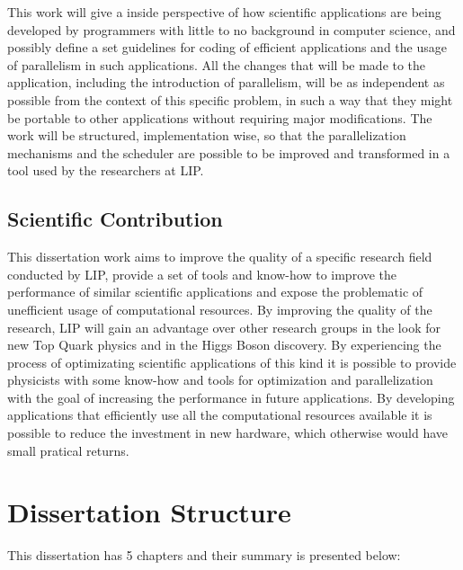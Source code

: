 This work will give a inside perspective of how scientific applications are being developed by programmers with little to no background in computer science, and possibly define a set guidelines for coding of efficient applications and the usage of parallelism in such applications. All the changes that will be made to the \tth application, including the introduction of parallelism, will be as independent as possible from the context of this specific problem, in such a way that they might be portable to other applications without requiring major modifications. The work will be structured, implementation wise, so that the parallelization mechanisms and the scheduler are possible to be improved and transformed in a tool used by the researchers at LIP.

\subsection{Scientific Contribution}
\label{ScientificContribution}

This dissertation work aims to improve the quality of a specific research field conducted by LIP, provide a set of tools and know-how to improve the performance of similar scientific applications and expose the problematic of unefficient usage of computational resources. By improving the quality of the research, LIP will gain an advantage over other research groups in the look for new Top Quark physics and in the Higgs Boson discovery. By experiencing the process of optimizating scientific applications of this kind it is possible to provide physicists with some know-how and tools for optimization and parallelization with the goal of increasing the performance in future applications. By developing applications that efficiently use all the computational resources available it is possible to reduce the investment in new hardware, which otherwise would have small pratical returns.

\section{Dissertation Structure}
\label{DissertationStructure}

This dissertation has 5 chapters and their summary is presented below:

